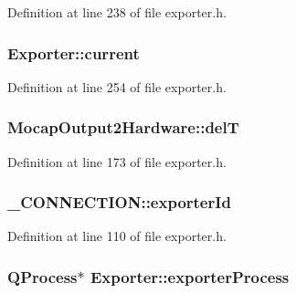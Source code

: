 Definition at line 238 of file exporter.\-h.

\hypertarget{group___mo_cap_plugin_ga6c17ed61598da30f012113ffbff26816}{
\subsubsection[{current}]{ Exporter\-::current\hspace{0.3cm}{\ttfamily [protected]}}}\label{group___mo_cap_plugin_ga6c17ed61598da30f012113ffbff26816}


Definition at line 254 of file exporter.\-h.

\hypertarget{group___mo_cap_plugin_ga0c6d6722adb60229659cfe26d61ec953}{
\subsubsection[{del\-T}]{ Mocap\-Output2\-Hardware\-::del\-T}}\label{group___mo_cap_plugin_ga0c6d6722adb60229659cfe26d61ec953}


Definition at line 173 of file exporter.\-h.

\hypertarget{group___mo_cap_plugin_ga2bff4ba6b082ec966a7075df9e19d66b}{
\subsubsection[{exporter\-Id}]{ \-\_\-\-C\-O\-N\-N\-E\-C\-T\-I\-O\-N\-::exporter\-Id}}\label{group___mo_cap_plugin_ga2bff4ba6b082ec966a7075df9e19d66b}


Definition at line 110 of file exporter.\-h.

\hypertarget{group___mo_cap_plugin_ga3e0f59d7efdaba4ae56afc474e929a17}{
\subsubsection[{exporter\-Process}]{\setlength{\rightskip}{0pt plus 5cm}Q\-Process$\ast$ Exporter\-::exporter\-Process\hspace{0.3cm}{\ttfamily [protected]}}}\label{group___mo_cap_plugin_ga3e0f59d7efdaba4ae56afc474e929a17}


